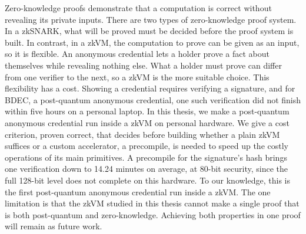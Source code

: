 \documentclass[dvipdfmx, a4j, 12pt]{article}
\theoremstyle{definition}
\theoremstyle{remark}
\begin{document}
\begin{coverabstract}
      Zero-knowledge proofs demonstrate that a computation is correct without revealing its private inputs. There are two types of zero-knowledge proof system. In a zkSNARK, what will be proved must be decided before the proof system is built. In contrast, in a zkVM, the computation to prove can be given as an input, so it is flexible. An anonymous credential lets a holder prove a fact about themselves while revealing nothing else. What a holder must prove can differ from one verifier to the next, so a zkVM is the more suitable choice. This flexibility has a cost. Showing a credential requires verifying a signature, and for BDEC, a post-quantum anonymous credential, one such verification did not finish within five hours on a personal laptop. In this thesis, we make a post-quantum anonymous credential run inside a zkVM on personal hardware. We give a cost criterion, proven correct, that decides before building whether a plain zkVM suffices or a custom accelerator, a precompile, is needed to speed up the costly operations of its main primitives. A precompile for the signature's hash brings one verification down to 14.24 minutes on average, at 80-bit security, since the full 128-bit level does not complete on this hardware. To our knowledge, this is the first post-quantum anonymous credential run inside a zkVM. The one limitation is that the zkVM studied in this thesis cannot make a single proof that is both post-quantum and zero-knowledge. Achieving both properties in one proof will remain as future work.
    \end{coverabstract}
    \newpage
    
    \tableofcontents
    \newpage
    
    \listoffigures
    \newpage
    
    \listoftables
    \newpage
    
    
    \newpage
    
    \newpage
    
    \newpage
    
    \newpage
    
    \newpage
     
    \newpage
    
    \newpage
    
    \newpage
    
    \newpage
    \acknowledgement

    \newpage
    
    
    

    \newpage
    
    
\end{document}
